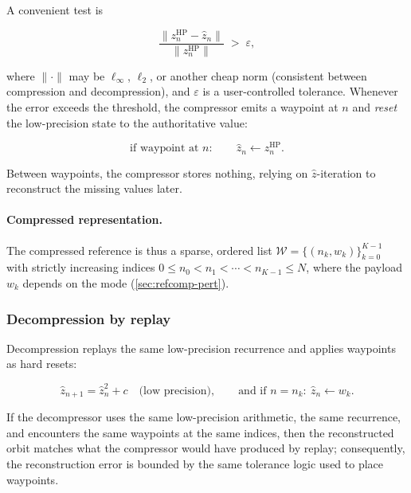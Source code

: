 A convenient test is

\begin{equation}
  \frac{\lVert z_n^{\mathrm{HP}} - \hat z_n \rVert}{\lVert z_n^{\mathrm{HP}} \rVert}
  \;>\; \varepsilon,
  \label{eq:relerr-test}
\end{equation}

where \(\lVert \cdot \rVert\) may be \(\ell_\infty\), \(\ell_2\), or another cheap norm
(consistent between compression and decompression), and \(\varepsilon\) is a
user-controlled tolerance.  Whenever the error exceeds the threshold, the compressor emits a waypoint at \(n\)
and \emph{reset} the low-precision state to the authoritative value:

\begin{equation}
  \text{if waypoint at } n:\qquad \hat z_n \leftarrow z_n^{\mathrm{HP}}.
  \label{eq:waypoint-reset}
\end{equation}

Between waypoints, the compressor stores nothing, relying on \(\hat z\)-iteration
to reconstruct the missing values later.

\paragraph{Compressed representation.}
The compressed reference is thus a sparse, ordered list
\(
\mathcal{W} = \{(n_k, w_k)\}_{k=0}^{K-1}
\)
with strictly increasing indices \(0 \le n_0 < n_1 < \cdots < n_{K-1} \le N\),
where the payload \(w_k\) depends on the mode (\cref{sec:refcomp-pert}).

\subsubsection{Decompression by replay}

Decompression replays the same low-precision recurrence and applies waypoints as
hard resets:

\begin{equation}
  \hat z_{n+1} = \hat z_n^2 + c \quad\text{(low precision)},\qquad
  \text{and if } n = n_k:\ \hat z_n \leftarrow w_k.
  \label{eq:decompress-replay}
\end{equation}

If the decompressor uses the same low-precision arithmetic, the same recurrence,
and encounters the same waypoints at the same indices, then the reconstructed
orbit matches what the compressor would have produced by replay; consequently,
the reconstruction error is bounded by the same tolerance logic used to place
waypoints.

